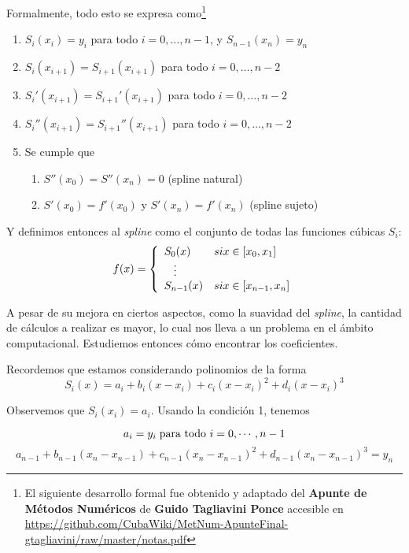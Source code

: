 Formalmente, todo esto se expresa como\footnote{El siguiente desarrollo formal fue obtenido y adaptado del \textbf{Apunte de Métodos Numéricos} de \textbf{Guido Tagliavini Ponce} accesible en \url{https://github.com/CubaWiki/MetNum-ApunteFinal-gtagliavini/raw/master/notas.pdf}}

\begin{enumerate}
\item $S_i(x_i) = y_i$ para todo $i = 0, \ldots, n-1$, y $S_{n-1}(x_n)=y_n$
\item $S_i(x_{i + 1}) = S_{i + 1}(x_{i + 1})$ para todo $i = 0, \ldots, n - 2$
\item $S_i'(x_{i + 1}) = S_{i + 1}'(x_{i + 1})$ para todo $i = 0, \ldots, n - 2$
\item $S_i''(x_{i + 1}) = S_{i + 1}''(x_{i + 1})$ para todo $i = 0, \ldots, n - 2$
\item Se cumple que
\begin{enumerate}
\item $S''(x_0) = S''(x_n) = 0$ (spline natural)
\item $S'(x_0) = f'(x_0)$ y $S'(x_n) = f'(x_n)$ (spline sujeto)
\end{enumerate} 
\end{enumerate}

Y definimos entonces al \emph{spline} como el conjunto de todas las funciones cúbicas $S_i$:
$$
f(x) = 
\left\{
    \begin{array}{ll}
        S_0(x)  & \mbox{si } x \in [x_{0}, x_1] \\
        \hspace{0.3cm}\vdots \\     
        S_{n - 1}(x) & \mbox{si } x \in [x_{n - 1}, x_n]
    \end{array}
\right.
$$


A pesar de su mejora en ciertos aspectos, como la suavidad del \emph{spline}, la cantidad de c\'alculos a realizar es mayor, lo cual nos lleva a un problema en el \'ambito computacional. Estudiemos entonces cómo encontrar los coeficientes.

Recordemos que estamos considerando polinomios de la forma 
\[S_i(x) = a_i + b_i (x - x_i) + c_i (x - x_i)^2 + d_i (x - x_i)^3\]

Observemos que $S_i(x_i) = a_i$. Usando la condición 1, tenemos

\[a_i = y_i \hspace{0.1cm}\text{para todo } i = 0, \cdots, n - 1\]
\[a_{n - 1} + b_{n - 1} (x_n - x_{n - 1}) + c_{n - 1} (x_n - x_{n - 1})^2 + d_{n - 1} (x_n - x_{n - 1})^3 = y_n\]

